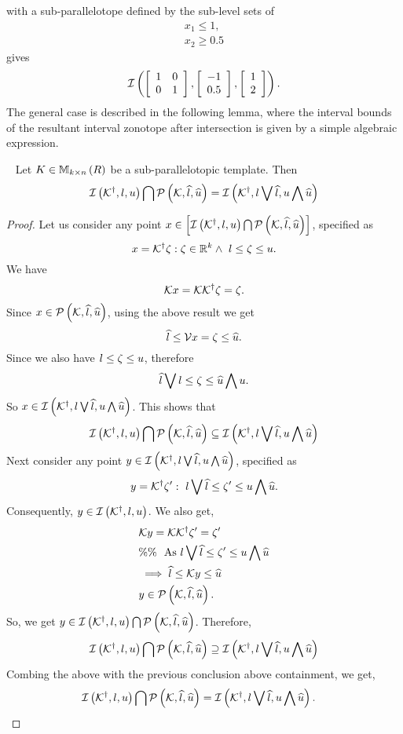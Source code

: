 with a sub-parallelotope defined by the sub-level sets of
%
\begin{align*}
  x_1\leq 1,\\
  x_2\geq 0.5
\end{align*}
%
gives
%
\[
\mathit{\operatorname{\mathcal{I}}}\left(\left[\begin{array}{l
        l}1 & 0 \\ 0 &
      1\end{array}\right],\left[\begin{array}{c}-1\\ 0.5\end{array}\right],\left[\begin{array}{c}1\\ 2\end{array}\right]\right).
\]
%
The general case is described in the following lemma, where the
interval bounds of the resultant interval zonotope after intersection
is given by a simple algebraic expression.
%
\begin{lemma}~\label{lem:motivation}
Let $K\in\mathbb{M}_{k\times n}\left(R\right)$ be a sub-parallelotopic template.  Then
\[
\mathit{\operatorname{\mathcal{I}}}\left({\mathcal{K}}^\dagger,l,u\right) \bigcap \mathcal{P}\left(\mathcal{K},\widehat{l},\widehat{u}\right)
= \mathit{\operatorname{\mathcal{I}}}\left({\mathcal{K}}^\dagger,l\bigvee \widehat{l},u\bigwedge \widehat{u}\right)
\]
\end{lemma}
%
\begin{proof}
Let us consider any point $x\in\left[\mathit{\operatorname{\mathcal{I}}}\left({\mathcal{K}}^\dagger,l,u\right) \bigcap
  \mathcal{P}\left(\mathcal{K},\widehat{l},\widehat{u}\right)\right]$, specified as
%
\[
x={\mathcal{K}}^\dagger\zeta:
\zeta\in\mathbb{R}^k\wedge~l\leq\zeta\leq u.
\]
%
We have
%
\[
\mathcal{K} x=\mathcal{K}{\mathcal{K}}^\dagger\zeta=\zeta.
\]
%
Since
$x\in\mathcal{P}\left(\mathcal{K},\widehat{l},\widehat{u}\right)$, using the above result we get
%
\[
\widehat{l}\leq\mathcal{V} x=\zeta\leq\widehat{u}.
\]
%
Since we also have $l\leq\zeta\leq u$, therefore
%
\[
\widehat{l}\bigvee l\leq\zeta\leq\widehat{u}\bigwedge u.
\]
%
So $x\in\mathit{\operatorname{\mathcal{I}}}\left({\mathcal{K}}^\dagger,l\bigvee \widehat{l},u\bigwedge
  \widehat{u}\right)$.  This shows that
%
\[
\mathit{\operatorname{\mathcal{I}}}\left({\mathcal{K}}^\dagger,l,u\right) \bigcap \mathcal{P}\left(\mathcal{K},\widehat{l},\widehat{u}\right)
\subseteq \mathit{\operatorname{\mathcal{I}}}\left({\mathcal{K}}^\dagger,l\bigvee \widehat{l},u\bigwedge \widehat{u}\right)
\]
%
Next consider any point $y\in\mathit{\operatorname{\mathcal{I}}}\left({\mathcal{K}}^\dagger,l\bigvee
  \widehat{l},u\bigwedge \widehat{u}\right)$, specified as
%
\[
y={\mathcal{K}}^\dagger\zeta^\prime:~l\bigvee \widehat{l}\leq\zeta^\prime\leq u\bigwedge \widehat{u}.
\]
%
Consequently, $y\in\mathit{\operatorname{\mathcal{I}}}\left({\mathcal{K}}^\dagger,l,u\right)$.
We also get,
%
\begin{align*}
  & \mathcal{K} y=\mathcal{K}{\mathcal{K}}^\dagger\zeta^\prime=\zeta^\prime\\
  & \%\% ~~\text{As}~l\bigvee \widehat{l}\leq\zeta^\prime\leq u\bigwedge \widehat{u}\\
  & \implies \widehat{l}\leq \mathcal{K} y\leq\widehat{u}\\
  & y\in\mathcal{P}\left(\mathcal{K},\widehat{l},\widehat{u}\right).
\end{align*}
%
So, we get $y\in\mathit{\operatorname{\mathcal{I}}}\left({\mathcal{K}}^\dagger,l,u\right) \bigcap
\mathcal{P}\left(\mathcal{K},\widehat{l},\widehat{u}\right)$.  Therefore,
%
\[
\mathit{\operatorname{\mathcal{I}}}\left({\mathcal{K}}^\dagger,l,u\right) \bigcap \mathcal{P}\left(\mathcal{K},\widehat{l},\widehat{u}\right)
\supseteq \mathit{\operatorname{\mathcal{I}}}\left({\mathcal{K}}^\dagger,l\bigvee \widehat{l},u\bigwedge \widehat{u}\right)
\]
%
Combing the above with the previous conclusion above containment, we
get,
%
\[
\mathit{\operatorname{\mathcal{I}}}\left({\mathcal{K}}^\dagger,l,u\right) \bigcap \mathcal{P}\left(\mathcal{K},\widehat{l},\widehat{u}\right)
= \mathit{\operatorname{\mathcal{I}}}\left({\mathcal{K}}^\dagger,l\bigvee \widehat{l},u\bigwedge \widehat{u}\right).~~~\qedhere
\]
%
\end{proof}
